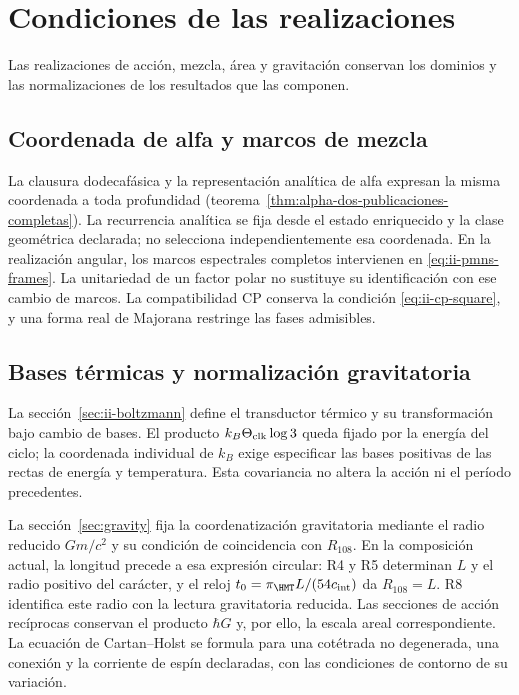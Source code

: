 \section{Condiciones de las realizaciones}
\label{sec:ii-condiciones-realizaciones}

Las realizaciones de acción, mezcla, área y gravitación conservan
los dominios y las normalizaciones de los resultados que las componen.

\subsection{Coordenada de alfa y marcos de mezcla}

La clausura dodecafásica y la representación analítica de alfa expresan
la misma coordenada a toda profundidad
(teorema~\ref{thm:alpha-dos-publicaciones-completas}).
La recurrencia analítica se fija desde el estado enriquecido y la clase
geométrica declarada; no selecciona independientemente esa coordenada.
En la realización angular, los marcos espectrales completos intervienen
en \eqref{eq:ii-pmns-frames}. La unitariedad de un factor polar no sustituye
su identificación con ese cambio de marcos. La compatibilidad CP conserva
la condición \eqref{eq:ii-cp-square}, y una forma real de Majorana restringe
las fases admisibles.

\subsection{Bases térmicas y normalización gravitatoria}

La sección~\ref{sec:ii-boltzmann} define el transductor térmico y su
transformación bajo cambio de bases. El producto
\(k_B\Theta_{\rm clk}\log3\) queda fijado por la energía del ciclo;
la coordenada individual de \(k_B\) exige especificar las bases positivas
de las rectas de energía y temperatura. Esta covariancia no altera
la acción ni el período precedentes.

La sección~\ref{sec:gravity} fija la coordenatización gravitatoria mediante el radio
reducido \(Gm/c^2\) y su condición de coincidencia con \(R_{108}\).
En la composición actual, la longitud precede a esa expresión circular:
R4 y R5 determinan \(L\) y el radio positivo del carácter, y el reloj
\(t_0=\pi_{\HMT}L/(54c_{\rm int})\) da \(R_{108}=L\).
R8 identifica este radio con la lectura gravitatoria reducida.
Las secciones de acción recíprocas conservan el producto \(\hbar G\)
y, por ello, la escala areal correspondiente. La ecuación de Cartan--Holst
se formula para una cotétrada no degenerada, una conexión y la corriente
de espín declaradas, con las condiciones de contorno de su variación.

